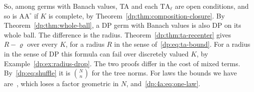 So, among germs with Banach values, TA and each $\mathrm{TA}_\ell$ are open conditions, and so is $\mathrm{AA}^\circ$ if $K$ is complete, by Theorem~\ref{dp:thm:composition-closure}. By Theorem~\ref{dp:thm:whole-ball}, a DP germ with Banach values is also DP on its whole ball. The difference is the radius. Theorem~\ref{dp:thm:ta-recenter} gives $R-\varrho$ over every $K$, for a radius $R$ in the sense of~\eqref{dp:eq:ta-bound}. For a radius in the sense of DP this formula can fail over discretely valued $K$, by Example~\ref{dp:ex:radius-drop}. The two proofs differ in the cost of mixed terms. By~\eqref{dp:eq:shuffle} it is $\binom Nn$ for the tree norms. For laws the bounds we have are~\cite[(Q.2)]{I}, which loses a factor geometric in $N$, and~\eqref{dp:4a:eq:one-law}.
